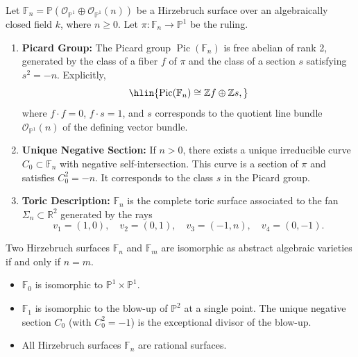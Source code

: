 \begin{theorem}
Let $\mathbb{F}_n = \mathbb{P}(\mathcal{O}_{\mathbb{P}^1} \oplus \mathcal{O}_{\mathbb{P}^1}(n))$ be a Hirzebruch surface over an algebraically closed field $k$, where $n \ge 0$. Let $\pi: \mathbb{F}_n \to \mathbb{P}^1$ be the ruling.
\begin{enumerate}
    \item \textbf{Picard Group:} The Picard group $\operatorname{Pic}(\mathbb{F}_n)$ is free abelian of rank 2, generated by the class of a fiber $f$ of $\pi$ and the class of a section $s$ satisfying $s^2 = -n$. Explicitly,
    $$\hlin{\operatorname{Pic}(\mathbb{F}_n) \cong \mathbb{Z} f \oplus \mathbb{Z} s,}$$
    where $f \cdot f = 0$, $f \cdot s = 1$, and $s$ corresponds to the quotient line bundle $\mathcal{O}_{\mathbb{P}^1}(n)$ of the defining vector bundle.
    \item \textbf{Unique Negative Section:} If $n > 0$, there exists a unique irreducible curve $C_0 \subset \mathbb{F}_n$ with negative self-intersection. This curve is a section of $\pi$ and satisfies $C_0^2 = -n$. It corresponds to the class $s$ in the Picard group.
    \item \textbf{Toric Description:} $\mathbb{F}_n$ is the complete toric surface associated to the fan $\Sigma_n \subset \mathbb{R}^2$ generated by the rays
    $$v_1 = (1, 0), \quad v_2 = (0, 1), \quad v_3 = (-1, n), \quad v_4 = (0, -1).$$
\end{enumerate}
\end{theorem}

\begin{proposition}
Two Hirzebruch surfaces $\mathbb{F}_n$ and $\mathbb{F}_m$ are isomorphic as abstract algebraic varieties if and only if $n = m$.
\end{proposition}

\begin{theorem}
\begin{itemize}
    \item $\mathbb{F}_0$ is isomorphic to $\mathbb{P}^1 \times \mathbb{P}^1$.
    \item $\mathbb{F}_1$ is isomorphic to the blow-up of $\mathbb{P}^2$ at a single point. The unique negative section $C_0$ (with $C_0^2 = -1$) is the exceptional divisor of the blow-up.
    \item All Hirzebruch surfaces $\mathbb{F}_n$ are rational surfaces.
\end{itemize}
\end{theorem}

